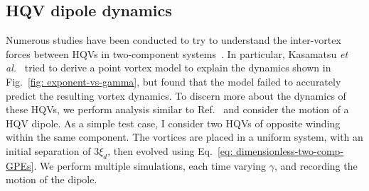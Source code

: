 \subsection{HQV dipole dynamics}
Numerous studies have been conducted to try to understand the inter-vortex
forces between HQVs in two-component systems~\cite{Eto2011, Kasamatsu2016}.
In particular, Kasamatsu \textit{et al.}~\cite{Kasamatsu2016} tried to derive a
point vortex model to explain the dynamics shown in
Fig.~\ref{fig: exponent-vs-gamma}, but found that the model failed to accurately
predict the resulting vortex dynamics.
To discern more about the dynamics of these HQVs, we perform analysis similar to
Ref.~\cite{Kasamatsu2016} and consider the motion of a HQV dipole.
As a simple test case, I consider two HQVs of opposite winding within the same
component.
The vortices are placed in a uniform system, with an initial separation of
\(3\xi_d\), then evolved using Eq.~\eqref{eq: dimensionless-two-comp-GPEs}.
We perform multiple simulations, each time varying \(\gamma \), and recording
the motion of the dipole.

